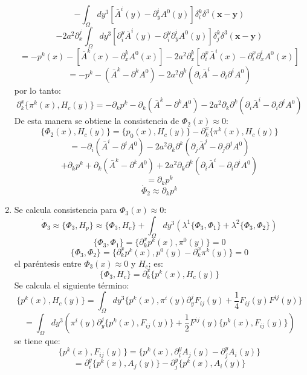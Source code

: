 \documentclass[a4paper,12pt]{article}
\begin{document}
\begin{enumerate}
$$-\int_{\Omega}dy^3[\bar{A}^i(y)-\partial^i_y A^0(y)]\delta^k_i\delta^3(\textbf{x}-\textbf{y})$$
$$-2a^2\partial^j_x\int_{\Omega}dy^3[\partial_i^y\bar{A}^i(y)-\partial_i^y\partial^i_yA^0(y)]\delta^k_j\delta^3(\textbf{x}-\textbf{y})$$
$$=-p^{k}(x)-[\bar{A}^k(x)-\partial^k_x A^0(x)]-2a^2\partial^k_x[\partial_i^x\bar{A}^i(x)-\partial_i^x\partial^i_xA^0(x)]$$
$$=-p^{k}-(\bar{A}^k-\partial^k A^0)-2a^2\partial^k(\partial_i\bar{A}^i-\partial_i\partial^iA^0)$$
por lo tanto:
\begin{equation}
\partial_k^x\{\pi^k(x),H_c(y)\}= -\partial_kp^{k}-\partial_k(\bar{A}^k-\partial^k A^0)-2a^2\partial_k\partial^k(\partial_i\bar{A}^i-\partial_i\partial^iA^0)
\end{equation}
De esta manera se obtiene la consistencia de $\Phi_2(x)\approx0$: 
\begin{equation}
\{\Phi_2(x),H_c(y)\}=\{p_0(x),H_c(y)\}-\partial_k^x\{\pi^k(x),H_c(y)\} 
\end{equation}
$$=-\partial_i(\bar{A}^i-\partial^iA^0)-2a^2\partial_k\partial^k(\partial_j\bar{A}^j-\partial_j\partial^jA^0)$$
$$+\partial_kp^{k}+\partial_k(\bar{A}^k-\partial^k A^0)+2a^2\partial_k\partial^k(\partial_i\bar{A}^i-\partial_i\partial^iA^0)$$
$$=\partial_kp^{k}$$
\begin{equation}
 \dot{\Phi}_2\approx\partial_kp^{k}   
\end{equation}
\item[\fbox{3.}] Se calcula consistencia para $\Phi_3(x)\approx0$:
\begin{equation}
\dot{\Phi}_3\approx\{\Phi_3,H_p\}\approx\{\Phi_3,H_c\}+\int_{\Omega}dy^3(\lambda^1\{\Phi_3,\Phi_1\}+\lambda^2\{\Phi_3,\Phi_2\})  
\end{equation}
$$\{\Phi_3,\Phi_1\}=\{\partial_k^xp^{k}(x),\pi^0(y)\}=0$$
$$ \{\Phi_3,\Phi_2\}=\{\partial_k^xp^{k}(x),p^0(y)-\partial_k^x\pi^k(y)\}=0$$
el paréntesis entre  $\Phi_3(x)\approx0$ y $H_c$; es:
$$
\{\Phi_3,H_c\}=\partial_k^x\{p^{k}(x),H_c(y)\} 
$$
Se calcula el siguiente término:
\begin{equation}
\{p^{k}(x),H_c(y)\}= \int_{\Omega}dy^3\{p^{k}(x),\pi^{i}(y)\partial^j_y F_{ij}(y)+\frac{1}{4} F_{ij}(y)F^{ij}(y)\}
\end{equation}
$$=\int_{\Omega}dy^3\left(\pi^{i}(y)\partial^j_y\{p^{k}(x), F_{ij}(y)\}+\frac{1}{2} F^{ij}(y)\{p^{k}(x),F_{ij}(y)\}\right)$$
se tiene que:
\begin{equation}
\{p^{k}(x), F_{ij}(y)\}=\{p^{k}(x),\partial_i^yA_j(y)-\partial_j^yA_i(y)\} 
\end{equation}
$$=\partial_i^y\{p^{k}(x),A_j(y)\}-\partial_j^y\{p^{k}(x),A_i(y)\}$$

\end{enumerate}
\end{document}
